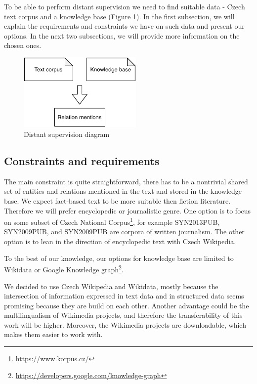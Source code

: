 To be able to perform distant supervision we need to find suitable data - Czech text corpus and a knowledge base (Figure \ref{obr03:DSD}). In the first subsection, we will explain the requirements and constraints we have on such data and present our options. In the next two subsections, we will provide more information on the chosen ones.

\begin{figure}[h]\centering
\includegraphics[width=60mm]{./img//Diplomka diagramy-Distant supervision}
\caption{Distant supervision diagram}
\label{obr03:DSD}
\end{figure}

\subsection{Constraints and requirements}
The main constraint is quite straightforward, there has to be a nontrivial shared set of entities and relations mentioned in the text and stored in the knowledge base. We expect fact-based text to be more suitable then fiction literature. Therefore we will prefer encyclopedic or journalistic genre. One option is to focus on some subset of Czech National Corpus\footnote{\url{https://www.korpus.cz/}}, for example SYN2013PUB, SYN2009PUB, and SYN2009PUB are corpora of written journalism. The other option is to lean in the direction of encyclopedic text with Czech Wikipedia.

To the best of our knowledge, our options for knowledge base are limited to Wikidata or Google Knowledge graph\footnote{\url{https://developers.google.com/knowledge-graph}}.

We decided to use Czech Wikipedia and Wikidata, mostly because the intersection of information expressed in text data and in structured data seems promising because they are build on each other. Another advantage could be the multilingualism of Wikimedia projects, and therefore the transferability of this work will be higher. Moreover, the Wikimedia projects are downloadable, which makes them easier to work with.


